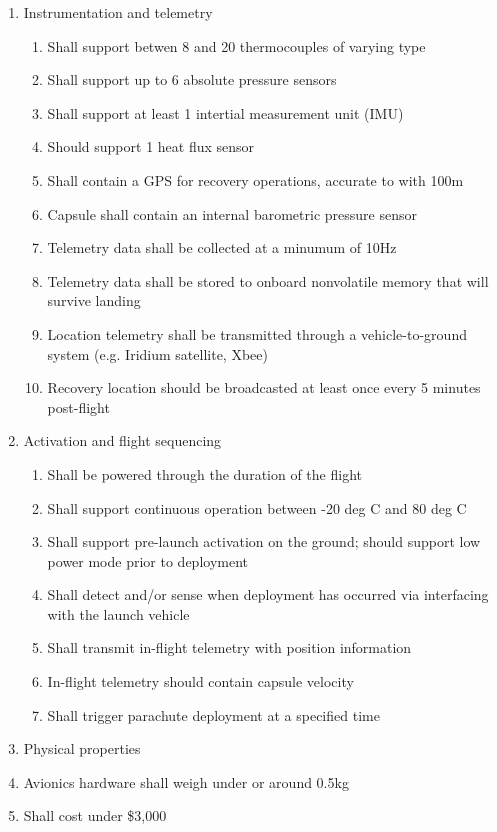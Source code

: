 \documentclass{article}
\begin{document}
\begin{enumerate}
\item Instrumentation and telemetry
  \begin{enumerate}
	  \item Shall support betwen 8 and 20 thermocouples of varying type
	  \item Shall support up to 6 absolute pressure sensors
	  \item Shall support at least 1 intertial measurement unit (IMU)
	  \item Should support 1 heat flux sensor
	  \item Shall contain a GPS for recovery operations, accurate to with 100m
	  \item Capsule shall contain an internal barometric pressure sensor 
	  \item Telemetry data shall be collected at a minumum of 10Hz
	  \item Telemetry data shall be stored to onboard nonvolatile memory that will survive landing
	  \item Location telemetry shall be transmitted through a vehicle-to-ground system (e.g. Iridium satellite, Xbee)
	  \item Recovery location should be broadcasted at least once every 5 minutes post-flight
  \end{enumerate}
\item Activation and flight sequencing
  \begin{enumerate}
	  \item Shall be powered through the duration of the flight
	  \item Shall support continuous operation between -20 deg C and 80 deg C
	  \item Shall support pre-launch activation on the ground; should support low power mode prior to deployment
	  \item Shall detect and/or sense when deployment has occurred via interfacing with the launch vehicle
	  \item Shall transmit in-flight telemetry with position information
	  \item In-flight telemetry should contain capsule velocity 
	  \item Shall trigger parachute deployment at a specified time
  \end{enumerate}
\item Physical properties
\item Avionics hardware shall weigh under or around 0.5kg
\item Shall cost under \$3,000
\end{enumerate}
\end{document}

